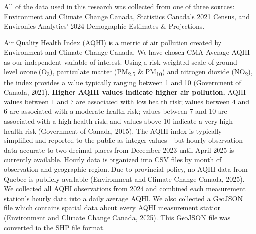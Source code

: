 \documentclass[AEJ]{AEA}
\begin{document}
All of the data used in this research was collected from one of three sources:
Environment and Climate Change Canada, Statistics Canada’s 2021 Census,
and Environics Analytics’ 2024 Demographic Estimates \& Projections. 

Air Quality Health Index (AQHI) is a metric of air pollution created by
Environment and Climate Change Canada. We have chosen CMA Average AQHI as our
independent variable of interest. Using a risk-weighted scale of
ground-level ozone (O\textsubscript{3}), particulate matter 
(PM\textsubscript{2.5} \& PM\textsubscript{10}) and nitrogen dioxide
(NO\textsubscript{2}), the index provides a value typically ranging between 1
and 10 (Government of Canada, 2021). \textbf{Higher AQHI values indicate higher
air pollution.} AQHI values between 1 and 3 are associated with 
low health risk;
values between 4 and 6 are associated with a moderate health risk; values
between 7 and 10 are associated with a high health risk; and values above 10
indicate a very high health risk (Government of Canada, 2015). The AQHI index is 
typically simplified and reported to
the public as integer values—but hourly observation data accurate to two decimal places
from December 2023 until April 2025 is currently available. Hourly data is 
organized into CSV files by
month of observation and geographic region. Due to 
provincial policy, no AQHI data from Quebec is publicly available (Environment and Climate Change Canada, 2025).
We collected all AQHI observations from 2024 and combined each measurement 
station's hourly data into a daily average AQHI.
We also collected a GeoJSON file which contains
spatial data about every AQHI measurement station (Environment and Climate Change Canada, 
2025). This GeoJSON file was converted to the SHP file format.
\end{document}
